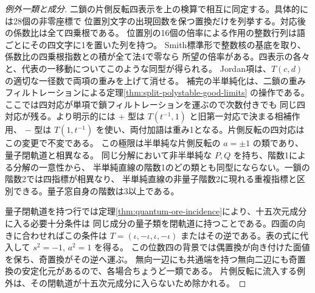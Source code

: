 \begin{proof}[例外一類と成分]
二鎖の片側反転四表示を上の検算で相互に同定する。具体的には28個の非零座標で
位置別文字の出現回数を保つ置換だけを列挙する。対応後の係数比は全て四乗根である。
位置別の16個の倍率による作用の整数行列は語ごとにその四文字に1を置いた列を持つ。
Smith標準形で整数核の基底を取り、係数比の四乗根指数との積が全て法4で零なら
所望の倍率がある。四表示の各々と、代表の一移動についてこのような同型が得られる。
Jordan項は、$T(c,d)$ の適切な一径数で両項の重みを上げて消せる。
補完の半単純化は、二鎖の重みフィルトレーションによる定理\ref{thm:split-polystable-good-limits}
の操作である。ここでは四対応が単項で鎖フィルトレーションを運ぶので次数付きでも
同じ四対応が残る。より明示的には $+$ 型は $T(t^{-1},1)$ と旧第一対応で決まる相補作用、
$-$ 型は $T(1,t^{-1})$ を使い、両付加語は重み1となる。片側反転の四対応はこの変更で不変である。
この極限は半単純な片側反転の $a=\pm1$ の類であり、量子閉軌道と相異なる。
同じ分解において非半単純な $P,Q$ を持ち、階数1による分解の一意性から、
半単純直線の階数1のどの類とも同型にならない。一鎖の階数2では四指標が相異なり、
半単純直線の非量子階数2に現れる重複指標と区別できる。量子窓自身の階数は3以上である。

量子閉軌道を持つ行では定理\ref{thm:quantum-ore-incidence}により、十五次元成分に入る必要十分条件は
同じ成分の量子類を閉軌道に持つことである。四面の向きに合わせればこの条件は
$T=(\iota,-\iota,\iota,-\iota)$ またはその逆である。表の式に代入して $s^2=-1$, $a^2=1$ を得る。
この位数四の背景では偶置換が向き付けた面値を保ち、奇置換がその逆へ運ぶ。
無向一辺にも共通端を持つ無向二辺にも奇置換の安定化元があるので、各場合ちょうど一類である。
片側反転に流入する例外は、その閉軌道が十五次元成分に入らないため除かれる。
\end{proof}
